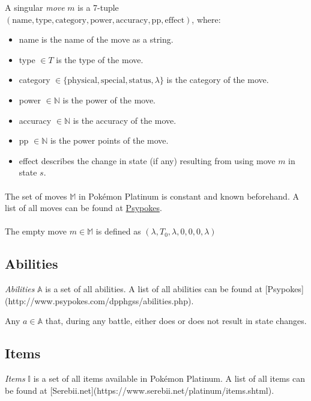 A singular \emph{move} $m$ is a 7-tuple $(\text{name}, \text{type}, \text{category}, \text{power}, \text{accuracy}, \text{pp}, \text{effect})$, where:
\begin{itemize}
    \item name is the name of the move as a string.
    \item type $\in T$ is the type of the move.
    \item category $\in \{ \text{physical}, \text{special}, \text{status}, \lambda \}$ is the category of the move.
    \item power $\in \mathbb{N}$ is the power of the move.
    \item accuracy $\in \mathbb{N}$ is the accuracy of the move.
    \item pp $\in \mathbb{N}$ is the power points of the move.
    \item effect describes the change in state (if any) resulting from using move $m$ in state $s$.
\end{itemize}

\paragraph{}
The set of moves $\mathbb{M}$ in Pokémon Platinum is constant and known beforehand. A list of all moves can be found at \href{http://www.psypokes.com/dpphgss/attacks.php}{Psypokes}.

\paragraph{}
The empty move $m \in \mathbb{M}$ is defined as $(\lambda, T_0, \lambda, 0, 0, 0, \lambda)$

\subsection{Abilities}

\emph{Abilities} $\mathbb{A}$ is a set of all abilities. A list of all abilities can be found at [Psypokes](http://www.psypokes.com/dpphgss/abilities.php).

Any $a \in \mathbb{A}$ that, during any battle, either does or does not result in state changes.

\subsection{Items}

\emph{Items} $\mathbb{I}$ is a set of all items available in Pokémon Platinum. A list of all items can be found at [Serebii.net](https://www.serebii.net/platinum/items.shtml).

